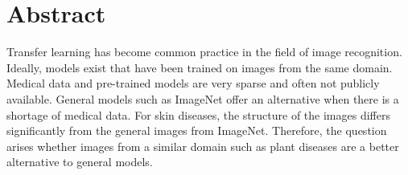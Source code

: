 \chapter*{Abstract}

Transfer learning has become common practice in the field of image recognition. Ideally, models exist that have been trained on images from the same domain. Medical data and pre-trained models are very sparse and often not publicly available. General models such as ImageNet offer an alternative when there is a shortage of medical data. For skin diseases, the structure of the images differs significantly from the general images from ImageNet. Therefore, the question arises whether images from a similar domain such as plant diseases are a better alternative to general models.


